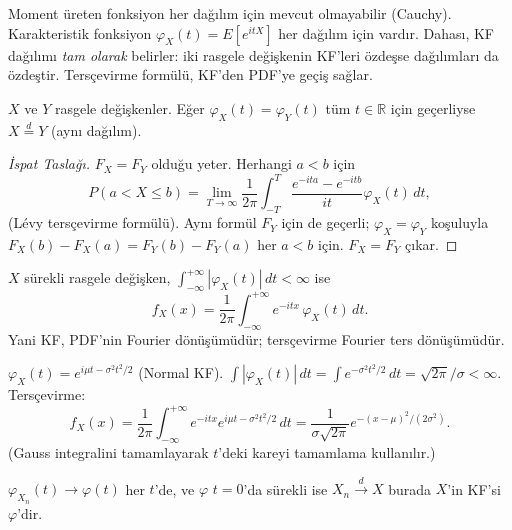 \begin{motivasyon}
Moment üreten fonksiyon her dağılım için mevcut olmayabilir (Cauchy).
Karakteristik fonksiyon $\varphi_X(t) = E[e^{itX}]$ her dağılım için vardır.
Dahası, KF dağılımı \emph{tam olarak} belirler: iki rasgele değişkenin KF'leri özdeşse
dağılımları da özdeştir. Tersçevirme formülü, KF'den PDF'ye geçiş sağlar.
\end{motivasyon}

\begin{teorem}
\label{thm:kf_benzersizlik}
$X$ ve $Y$ rasgele değişkenler. Eğer $\varphi_X(t) = \varphi_Y(t)$ tüm $t \in \mathbb{R}$ için
geçerliyse $X \overset{d}{=} Y$ (aynı dağılım).
\end{teorem}

\begin{proof}[İspat Taslağı]
$F_X = F_Y$ olduğu yeter. Herhangi $a < b$ için
\[
  P(a < X \leq b) = \lim_{T\to\infty} \frac{1}{2\pi} \int_{-T}^T \frac{e^{-ita}-e^{-itb}}{it}\varphi_X(t)\,dt,
\]
(Lévy tersçevirme formülü). Aynı formül $F_Y$ için de geçerli; $\varphi_X = \varphi_Y$ koşuluyla
$F_X(b)-F_X(a) = F_Y(b)-F_Y(a)$ her $a < b$ için. $F_X = F_Y$ çıkar.
\end{proof}

\begin{teorem}
\label{thm:kf_terscevir}
$X$ sürekli rasgele değişken, $\int_{-\infty}^{+\infty} |\varphi_X(t)|\,dt < \infty$ ise
\[
  f_X(x) = \frac{1}{2\pi} \int_{-\infty}^{+\infty} e^{-itx}\,\varphi_X(t)\,dt.
\]
Yani KF, PDF'nin Fourier dönüşümüdür; tersçevirme Fourier ters dönüşümüdür.
\end{teorem}

\begin{ornek}
$\varphi_X(t) = e^{i\mu t - \sigma^2 t^2/2}$ (Normal KF).
$\int |\varphi_X(t)|\,dt = \int e^{-\sigma^2 t^2/2}\,dt = \sqrt{2\pi}/\sigma < \infty$.
Tersçevirme:
\[
  f_X(x) = \frac{1}{2\pi}\int_{-\infty}^{+\infty} e^{-itx} e^{i\mu t - \sigma^2 t^2/2}\,dt
  = \frac{1}{\sigma\sqrt{2\pi}} e^{-(x-\mu)^2/(2\sigma^2)}.
\]
(Gauss integralini tamamlayarak $t$'deki kareyi tamamlama kullanılır.)
\end{ornek}

\begin{teorem}
\label{thm:levy_sureklilik}
$\varphi_{X_n}(t) \to \varphi(t)$ her $t$'de, ve $\varphi$ $t=0$'da sürekli ise
$X_n \xrightarrow{d} X$ burada $X$'in KF'si $\varphi$'dir.
\end{teorem}

